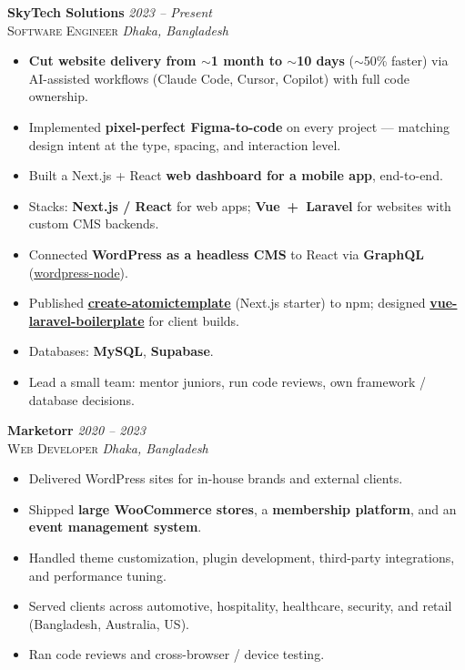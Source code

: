 \documentclass[10pt,letterpaper]{article}
\newcommand{\role}[4]{%
  \noindent\textbf{#1} \hfill \textit{#3}\\
  \textsc{#2} \hfill \textit{#4}\vspace{2pt}
}
\begin{document}
\role{SkyTech Solutions}{Software Engineer}{2023 -- Present}{Dhaka, Bangladesh}
\begin{itemize}
  \item \textbf{Cut website delivery from $\sim$1 month to $\sim$10 days} ($\sim$50\% faster) via AI-assisted workflows (Claude Code, Cursor, Copilot) with full code ownership.
  \item Implemented \textbf{pixel-perfect Figma-to-code} on every project — matching design intent at the type, spacing, and interaction level.
  \item Built a Next.js + React \textbf{web dashboard for a mobile app}, end-to-end.
  \item Stacks: \textbf{Next.js / React} for web apps; \textbf{Vue~+~Laravel} for websites with custom CMS backends.
  \item Connected \textbf{WordPress as a headless CMS} to React via \textbf{GraphQL} (\href{https://github.com/nomanjawad/wordpress-node}{wordpress-node}).
  \item Published \href{https://www.npmjs.com/package/create-atomictemplate}{\textbf{create-atomictemplate}} (Next.js starter) to npm; designed \href{https://github.com/nomanjawad/vue-laravel-boilerplate}{\textbf{vue-laravel-boilerplate}} for client builds.
  \item Databases: \textbf{MySQL}, \textbf{Supabase}.
  \item Lead a small team: mentor juniors, run code reviews, own framework / database decisions.
\end{itemize}

\vspace{4pt}
\role{Marketorr}{Web Developer}{2020 -- 2023}{Dhaka, Bangladesh}
\begin{itemize}
  \item Delivered WordPress sites for in-house brands and external clients.
  \item Shipped \textbf{large WooCommerce stores}, a \textbf{membership platform}, and an \textbf{event management system}.
  \item Handled theme customization, plugin development, third-party integrations, and performance tuning.
  \item Served clients across automotive, hospitality, healthcare, security, and retail (Bangladesh, Australia, US).
  \item Ran code reviews and cross-browser / device testing.
\end{itemize}

\end{document}
